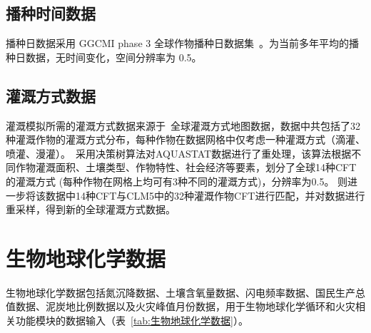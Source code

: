 \subsection{播种时间数据}\label{播种时间数据}
播种日数据采用 GGCMI phase 3 全球作物播种日数据集~\citep{jagermeyr2021climate}。为当前多年平均的播种日数据，无时间变化，空间分辨率为 0.5\textdegree。

\subsection{灌溉方式数据}\label{灌溉方式数据}
灌溉模拟所需的灌溉方式数据来源于~\citet{yao2022Irrigation}全球灌溉方式地图数据，数据中共包括了32种灌溉作物的灌溉方式分布，每种作物在数据网格中仅考虑一种灌溉方式（滴灌、喷灌、漫灌）。~\citet{jagermeyr2015irrigation}采用决策树算法对AQUASTAT数据\citep{fao2014aquastat}进行了重处理，该算法根据不同作物灌溉面积、土壤类型、作物特性、社会经济等要素，划分了全球14种CFT的灌溉方式 (每种作物在网格上均可有3种不同的灌溉方式)，分辨率为0.5\textdegree。\citet{yao2022Irrigation} 则进一步将该数据中14种CFT与CLM5中的32种灌溉作物CFT进行匹配，并对数据进行重采样，得到新的全球灌溉方式数据。


\section{生物地球化学数据}

生物地球化学数据包括氮沉降数据、土壤含氧量数据、闪电频率数据、国民生产总值数据、泥炭地比例数据以及火灾峰值月份数据，用于生物地球化学循环和火灾相关功能模块的数据输入（表~\ref{tab:生物地球化学数据}）。

